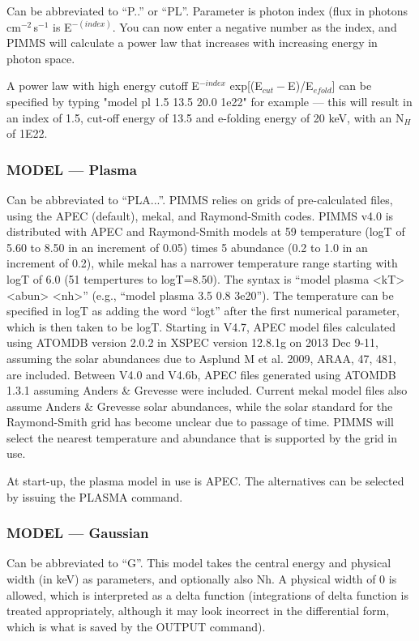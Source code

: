 \documentclass[11pt]{article}
\begin{document}
\begin{appendices}
Can be  abbreviated to ``P..'' or ``PL''.   Parameter is  photon index  (flux in
photons\,cm$^{-2}$\,s$^{-1}$ is E$^{-(index)}$.  You can now enter a negative
number as the index, and PIMMS will calculate a power law that increases
with increasing energy in photon space.

A power law with high energy cutoff E$^{-index}$ exp[(E$_{cut}-$E)/E$_{efold}$]
can be specified by typing "model pl 1.5 13.5 20.0 1e22" for example ---
this will result in an index of 1.5, cut-off energy of 13.5 and e-folding
energy of 20 keV, with an N$_H$ of 1E22.

\subsubsection{MODEL --- Plasma}

Can be abbreviated to ``PLA...''.  PIMMS relies on grids of
pre-calculated files, using the APEC (default), mekal, and Raymond-Smith
codes.  PIMMS v4.0 is distributed with APEC and Raymond-Smith models at
59 temperature (logT of 5.60 to 8.50 in an increment of 0.05) times 5
abundance (0.2 to 1.0 in an increment of 0.2), while mekal has a narrower
temperature range starting with logT of 6.0 (51 tempertures to logT=8.50).
The syntax is ``model plasma <kT> <abun> <nh>'' (e.g.,
``model plasma 3.5 0.8 3e20'').
The temperature can be specified in logT as adding the word ``logt'' after
the first numerical parameter, which is then taken to be logT.  Starting in
V4.7, APEC model files calculated using ATOMDB version 2.0.2 in XSPEC
version 12.8.1g on 2013 Dec 9-11, assuming the solar abundances due to
Asplund M et al. 2009, ARAA, 47, 481, are included. Between V4.0 and V4.6b,
APEC files generated using ATOMDB 1.3.1 assuming Anders \& Grevesse were
included. Current mekal model files also assume Anders \& Grevesse solar
abundances, while the solar standard for the Raymond-Smith grid has become
unclear due to passage of time.  PIMMS will select the nearest temperature
and abundance that is supported by the grid in use.

At start-up, the plasma model in use is APEC.  The alternatives can be
selected by issuing the PLASMA command.

\subsubsection{MODEL --- Gaussian}

Can be abbreviated to ``G''.  This model takes the central energy and physical
width (in keV) as parameters, and optionally also Nh.  A physical width of 0
is allowed, which is interpreted as a delta function (integrations of delta
function is treated appropriately, although it may look incorrect in the
differential form, which is what is saved by the OUTPUT command).


\end{appendices}
\end{document}
